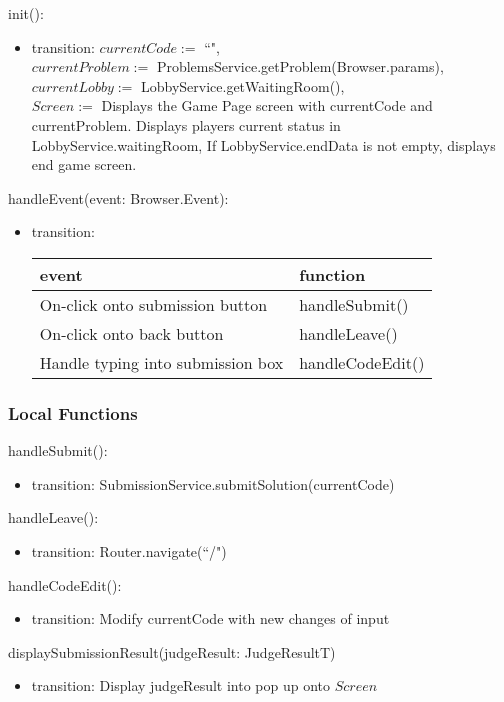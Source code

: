 \documentclass[12pt, titlepage]{article}
\begin{document}
\noindent init():
\begin{itemize}
\item transition: $currentCode :=$ ``",\\
$currentProblem :=$ ProblemsService.getProblem(Browser.params),\\
$currentLobby :=$ LobbyService.getWaitingRoom(),\\
$Screen :=$ Displays the Game Page screen with currentCode and currentProblem. Displays players current status in LobbyService.waitingRoom, If LobbyService.endData is not empty, displays end game screen.
\end{itemize}



\noindent handleEvent(event: Browser.Event):
\begin{itemize}
\item transition: \begin{tabular}{p{5cm} p{4cm}}
\hline
\textbf{event} & \textbf{function} \\
\hline
On-click onto submission button & handleSubmit() \\
On-click onto back button & handleLeave() \\
Handle typing into submission box & handleCodeEdit() \\
\hline
\end{tabular}
    
\end{itemize}

\subsubsection{Local Functions}

\noindent handleSubmit():
\begin{itemize}
\item transition: SubmissionService.submitSolution(currentCode)
\end{itemize}

\noindent handleLeave():
\begin{itemize}
\item transition: Router.navigate(``/")
\end{itemize}

\noindent handleCodeEdit():
\begin{itemize}
\item transition: Modify currentCode with new changes of input
\end{itemize}

\noindent displaySubmissionResult(judgeResult: JudgeResultT)
\begin{itemize}
\item transition: Display judgeResult into pop up onto $Screen$
\end{itemize}
\end{document}
